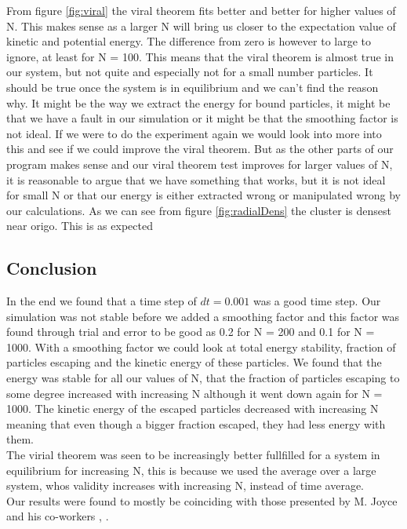 \documentclass{article}
\begin{document}
From figure \ref{fig:viral} the viral theorem fits better and better for higher values of N. This makes sense as a larger N will bring us closer to the expectation value of kinetic and potential energy. The difference from zero is however to large to ignore, at least for N = 100. This means that the viral theorem is almost true in our system, but not quite and especially not for a small number particles. It should be true once the system is in equilibrium and we can't find the reason why. It might be the way we extract the energy for bound particles, it might be that we have a fault in our simulation or it might be that the smoothing factor is not ideal. If we were to do the experiment again we would look into more into this and see if we could improve the viral theorem. But as the other parts of our program makes sense and our viral theorem test improves for larger values of N, it is reasonable to argue that we have something that works, but it is not ideal for small N or that our energy is either extracted wrong or manipulated wrong by our calculations.
As we can see from figure \ref{fig:radialDens} the cluster is densest near origo. This is as expected 

\subsection{Conclusion}
In the end we found that a time step of $dt = 0.001$ was a good time step. Our simulation was not stable before we added a smoothing factor and this factor was found through trial and error to be good as 0.2 for N = 200  and 0.1 for N = 1000. With a smoothing factor we could look at total energy stability, fraction of particles escaping and the kinetic energy of these particles. We found that the energy was stable for all our values of N, that the fraction of particles escaping to some degree increased with increasing N although it went down again for N = 1000. The kinetic energy of the escaped particles decreased with increasing N meaning that even though a bigger fraction escaped, they had less energy with them. \\
The virial theorem was seen to be increasingly better fullfilled for a system in equilibrium for increasing N, this is because we used the average over a large system, whos validity increases with increasing N, instead of time average. \\
Our results were found to mostly be coinciding with those presented by M. Joyce and his co-workers \cite{Joyce}, \cite{JoyceFull}.

\end{document}
